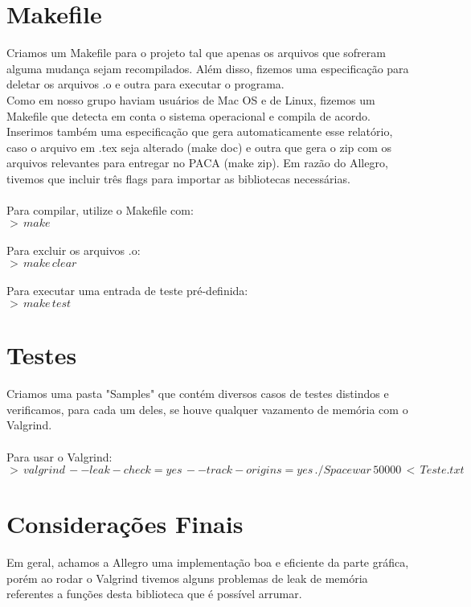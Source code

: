 \documentclass{article}
\begin{document}
\section{Makefile}
Criamos um Makefile para o projeto tal que apenas os arquivos que sofreram alguma mudança sejam recompilados. Além disso, fizemos uma especificação para deletar os arquivos .o e outra para executar o programa. \\
Como em nosso grupo haviam usuários de Mac OS e de Linux, fizemos um Makefile que detecta em conta o sistema operacional e compila de acordo.
Inserimos também uma especificação que gera automaticamente esse relatório, caso o arquivo em .tex seja alterado (make doc) e outra que gera o zip com os arquivos relevantes para entregar no PACA (make zip).
Em razão do Allegro, tivemos que incluir três flags para importar as bibliotecas necessárias. \\ \\
Para compilar, utilize o Makefile com:
\\
\indent $>\,make$ \\ \\
Para excluir os arquivos .o:
\\
\indent $>\,make\,clear$ \\ \\
Para executar uma entrada de teste pré-definida:
\\
\indent $>\,make\,test$


\section{Testes}
Criamos uma pasta "Samples" que contém diversos casos de testes distindos e verificamos, para cada um deles, se houve qualquer vazamento de memória com o Valgrind. \\ \\
Para usar o Valgrind:
\\
\indent $>\,valgrind\,--leak-check=yes\,--track-origins=yes\,./Spacewar\,50000\,<\,Teste.txt$

\section{Considerações Finais}
Em geral, achamos a Allegro uma implementação boa e eficiente da parte gráfica, porém ao rodar o Valgrind tivemos alguns problemas de leak de memória referentes a
funções desta biblioteca que é possível arrumar.
\end{document}
